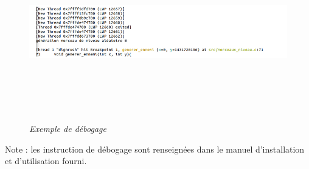 \documentclass[a4paper,12pt]{article}
\begin{document}
\begin{figure}[h]
	\begin{center}
		\includegraphics[height=7cm]{img/debug.png}\\
		\caption{{\emph{Exemple de débogage}}}
		\label{débogage}
	\end{center}
\end{figure}
Note : les instruction de débogage sont renseignées dans le manuel d'installation et d'utilisation fourni.

\end{document}
